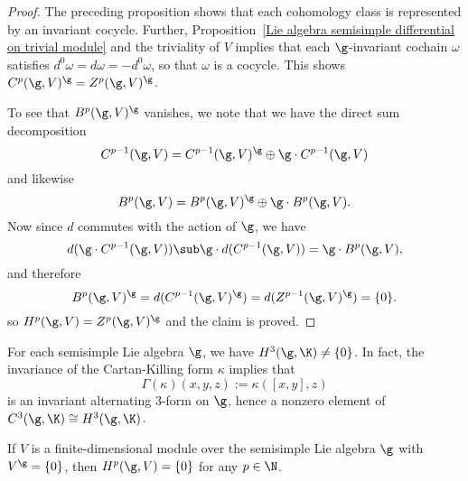 \begin{proof}
The preceding proposition shows that each cohomology class is represented by an invariant cocycle. Further, Proposition~\ref{Lie algebra semisimple differential on trivial module} and the triviality of $V$ implies that each $\g$-invariant cochain $\omega$ satisfies $d^0\omega=d\omega=-d^0\omega$, so that $\omega$ is a cocycle. This shows $C^p(\g,V)^\g=Z^p(\g,V)^\g$.\par
To see that $B^p(\g,V)^{\g}$ vanishes, we note that we have the direct sum decomposition
\[C^{p-1}(\g,V)=C^{p-1}(\g,V)^\g\oplus\g\cdot C^{p-1}(\g,V)\]
and likewise
\[B^{p}(\g,V)=B^{p}(\g,V)^\g\oplus\g\cdot B^{p}(\g,V).\]
Now since $d$ commutes with the action of $\g$, we have
\[d(\g\cdot C^{p-1}(\g,V))\sub\g\cdot d(C^{p-1}(\g,V))=\g\cdot B^p(\g,V),\]
and therefore
\[B^p(\g,V)^\g=d(C^{p-1}(\g,V)^\g)=d(Z^{p-1}(\g,V)^\g)=\{0\}.\]
so $H^p(\g,V)=Z^p(\g,V)^\g$ and the claim is proved.
\end{proof}
\begin{example}
For each semisimple Lie algebra $\g$, we have $H^3(\g,\K)\neq\{0\}$. In fact, the invariance of the Cartan-Killing form $\kappa$ implies that
\[\Gamma(\kappa)(x,y,z):=\kappa([x,y],z)\]
is an invariant alternating $3$-form on $\g$, hence a nonzero element of $C^3(\g,\K)\cong H^3(\g,\K)$.
\end{example}
\begin{theorem}
If $V$ is a finite-dimensional module over the semisimple Lie algebra $\g$ with $V^\g=\{0\}$, then $H^p(\g,V)=\{0\}$ for any $p\in\N$.
\end{theorem}
